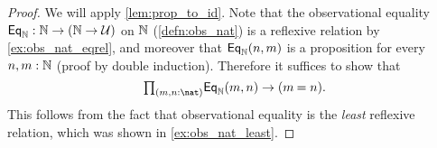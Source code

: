 \begin{proof}
We will apply \cref{lem:prop_to_id}. Note that the observational equality $\mathsf{Eq}_{\mathbb{N}}:{\mathbb{N}}\to({\mathbb{N}}\to\mathcal{U})$ on ${\mathbb{N}}$ (\cref{defn:obs_nat}) is a reflexive relation by \cref{ex:obs_nat_eqrel}, and moreover that $\mathsf{Eq}_{\mathbb{N}}(n,m)$ is a proposition for every $n,m:{\mathbb{N}}$ (proof by double induction).
Therefore it suffices to show that
\begin{equation*}
\prd{m,n:\nat}\mathsf{Eq}_\N(m,n)\to (\id{m}{n}).
\end{equation*}
This follows from the fact that observational equality is the \emph{least} reflexive relation, which was shown in \cref{ex:obs_nat_least}.
\end{proof}

\begin{comment}
\begin{thm}[Hedberg]\label{thm:dec_eq}
Any type with decidable equality is a set.
\end{thm}

\begin{proof}
Let $A$ be a type, and let $d:\prd{x,y:A}(\id{x}{y})+\neg(\id{x}{y})$ be the witness that $A$ has decidable equality.
We first construct a reflexive binary relation $E:A\to A\to\type$ such that each $E(x,y)$ is a proposition.
For every $x,y:A$, we first define a type family $E'(x,y):((\id{x}{y})+\neg(\id{x}{y}))\to\type$ by
\begin{align*}
E'(x,y,\inl(p)) & \defeq \unit \\
E'(x,y,\inr(p)) & \defeq \emptyt.
\end{align*}
Note that $E'(x,y,q)$ is a proposition for each $x,y:A$ and $q:(\id{x}{y})+\neg(\id{x}{y})$. 
Now we set $E(x,y)\defeq E'(x,y,d(x,y))$. Then $E$ is clearly reflexive, and a family of propositions.
Therefore it remains to show that $E$ implies identity. 

Since $E$ is defined as an instance of $E'$, it suffices to construct a term of type
\begin{equation*}
\prd{x,y:A}{q:(\id{x}{y})+\neg(\id{x}{y})} E'(q)\to (\id{x}{y}). 
\end{equation*}
By induction of disjoint sums, it suffices to construct terms of types
\begin{align*}
& \prd{x,y:A}{p:\id{x}{y}} \unit\to (\id{x}{y}) \\
& \prd{x,y:A}{p:\neg(\id{x}{y})} \emptyt\to (\id{x}{y}).
\end{align*}
In the first case, we take $\lam{x}{y}{p}{t}p$, and the second case is by induction on the empty type.
\end{proof}
\end{comment}

